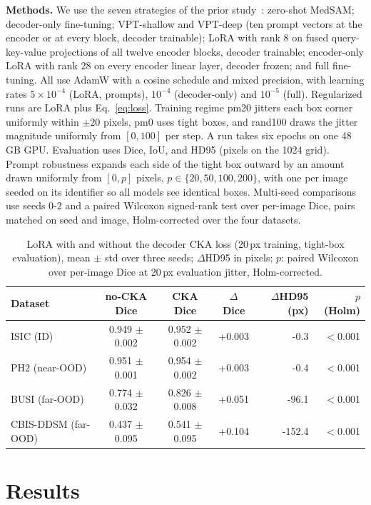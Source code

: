 \documentclass[runningheads]{llncs}
\begin{document}
\textbf{Methods.} We use the seven strategies of the prior study~\cite{prior2026safer}: zero-shot MedSAM; decoder-only fine-tuning; VPT-shallow and VPT-deep (ten prompt vectors at the encoder or at every block, decoder trainable); LoRA with rank 8 on fused query-key-value projections of all twelve encoder blocks, decoder trainable; encoder-only LoRA with rank 28 on every encoder linear layer, decoder frozen; and full fine-tuning. All use AdamW with a cosine schedule and mixed precision, with learning rates $5 \times 10^{-4}$ (LoRA, prompts), $10^{-4}$ (decoder-only) and $10^{-5}$ (full). Regularized runs are LoRA plus Eq.~\eqref{eq:loss}. Training regime pm20 jitters each box corner uniformly within $\pm 20$ pixels, pm0 uses tight boxes, and rand100 draws the jitter magnitude uniformly from $[0, 100]$ per step. A run takes six epochs on one 48\,GB GPU. Evaluation uses Dice, IoU, and HD95 (pixels on the 1024 grid). Prompt robustness expands each side of the tight box outward by an amount drawn uniformly from $[0, p]$ pixels, $p \in \{20, 50, 100, 200\}$, with one per image seeded on its identifier so all models see identical boxes. Multi-seed comparisons use seeds 0-2 and a paired Wilcoxon signed-rank test over per-image Dice, pairs matched on seed and image, Holm-corrected over the four datasets.

\begin{table}[tbp]
  \centering
  \caption{LoRA with and without the decoder CKA loss (20\,px training, tight-box evaluation), mean $\pm$ std over three seeds; $\Delta$HD95 in pixels; $p$: paired Wilcoxon over per-image Dice at 20\,px evaluation jitter, Holm-corrected.}
  \label{tab:cka}
  \small
  \begin{tabular}{lcccrr}
  \toprule
  Dataset & no-CKA Dice & CKA Dice & $\Delta$Dice & $\Delta$HD95 (px) & $p$ (Holm) \\
  \midrule
  ISIC (ID) & 0.949 $\pm$ 0.002 & 0.952 $\pm$ 0.002 & +0.003 & -0.3 & $<$0.001 \\
  PH2 (near-OOD) & 0.951 $\pm$ 0.001 & 0.954 $\pm$ 0.002 & +0.003 & -0.4 & $<$0.001 \\
  BUSI (far-OOD) & 0.774 $\pm$ 0.032 & 0.826 $\pm$ 0.008 & +0.051 & -96.1 & $<$0.001 \\
  CBIS-DDSM (far-OOD) & 0.437 $\pm$ 0.095 & 0.541 $\pm$ 0.095 & +0.104 & -152.4 & $<$0.001 \\
  \bottomrule
  \end{tabular}
\end{table}

\section{Results}
\label{sec:results}
\end{document}
